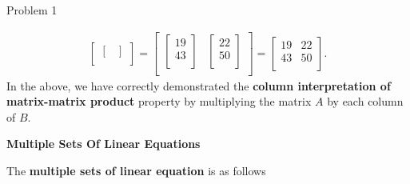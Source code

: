 \begin{problem}{Problem 1}
\begin{Highlight}[Solution]
\begin{align*}
\begin{bmatrix}
\begin{bmatrix}
                \end{bmatrix} \\
            \end{bmatrix}
            = 
            \begin{bmatrix}
                \begin{bmatrix}
                    19 \\
                    43 \\
                \end{bmatrix} &
                \begin{bmatrix}
                    22 \\
                    50 \\
                \end{bmatrix} \\
            \end{bmatrix}
            = 
            \begin{bmatrix}
                19 & 22 \\
                43 & 50 \\
            \end{bmatrix}.
        \end{align*}
        In the above, we have correctly demonstrated the \textbf{column interpretation of matrix-matrix product} property by multiplying the matrix $A$ by each column of $B$. \vspace*{1em}

        \noindent \textbf{Multiple Sets Of Linear Equations} \vspace*{1em}

        The \textbf{multiple sets of linear equation} is as follows 


\end{Highlight}
\end{problem}
